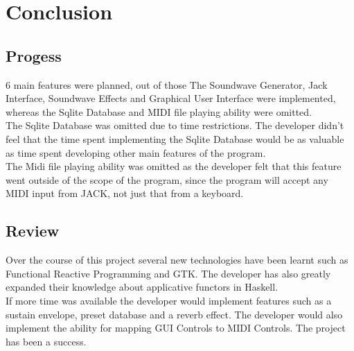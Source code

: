 \documentclass[11pt,a4paper]{article}
\begin{document}
\section{Conclusion}
\subsection{Progess}
6 main features were planned, out of those The Soundwave Generator, Jack Interface, Soundwave Effects and Graphical User Interface were implemented, whereas the Sqlite Database and MIDI file playing ability were omitted. \\

The Sqlite Database was omitted due to time restrictions. The developer didn't feel that the time spent implementing the Sqlite Database would be as valuable as time spent developing other main features of the program. \\

The Midi file playing ability was omitted as the developer felt that this feature went outside of the scope of the program, since the program will accept any MIDI input from JACK, not just that from a keyboard.

\subsection{Review}
Over the course of this project several new technologies have been learnt such as Functional Reactive Programming and GTK. The developer has also greatly expanded their knowledge about applicative functors in Haskell. \\ 
If more time was available the developer would implement features such as a sustain envelope, preset database and a reverb effect. The developer would also implement the ability for mapping GUI Controls to MIDI Controls.
The project has been a success.

\pagebreak
\end{document}
